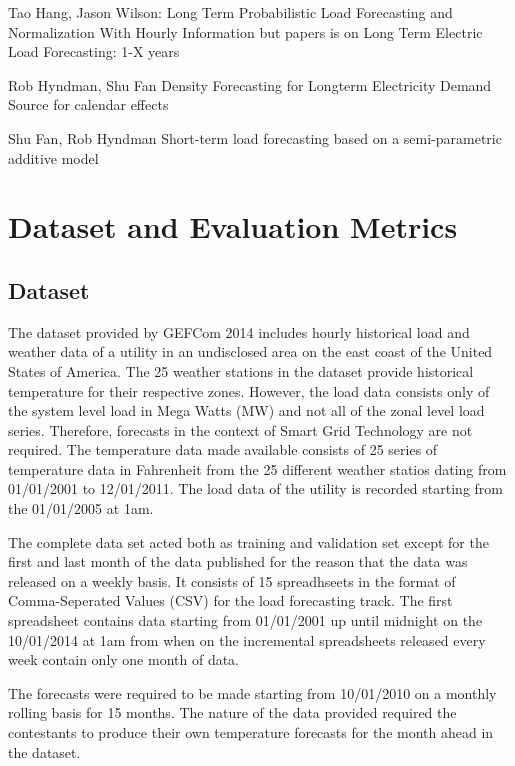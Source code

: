 \documentclass[conference]{IEEEtran}
\begin{document}
Tao Hang, Jason Wilson:
Long Term Probabilistic Load Forecasting and Normalization With Hourly Information
but papers is on Long Term Electric Load Forecasting: 1-X years \cite{Hong2014Normalization}

Rob Hyndman, Shu Fan
Density Forecasting for Longterm Electricity Demand
Source for calendar effects \cite{Hyndman2010}

Shu Fan, Rob Hyndman
Short-term load forecasting based on a semi-parametric additive model \cite{Fan2010}

\section{Dataset and Evaluation Metrics}
\subsection{Dataset}
The dataset provided by GEFCom 2014 includes hourly historical load and weather data of a utility in an undisclosed area on the east coast of the United States of America. The 25 weather stations in the dataset provide historical temperature for their respective zones. However, the load data consists only of the system level load in Mega Watts (MW) and not all of the zonal level load series. Therefore, forecasts in the context of Smart Grid Technology are not required. The temperature data made available consists of 25 series of temperature data in Fahrenheit from the 25 different weather statios dating from 01/01/2001 to 12/01/2011. The load data of the utility is recorded starting from the 01/01/2005 at 1am.\par
The complete data set acted both as training and validation set except for the first and last month of the data published for the reason that the data was released on a weekly basis. It consists of 15 spreadhseets in the format of Comma-Seperated Values (CSV) for the load forecasting track. The first spreadsheet contains data starting from 01/01/2001 up until midnight on the 10/01/2014 at 1am from when on the incremental spreadsheets released every week contain only one month of data.\par
The forecasts were required to be made starting from 10/01/2010 on a monthly rolling basis for 15 months. The nature of the data provided required the contestants to produce their own temperature forecasts for the month ahead in the dataset.\par
\end{document}
